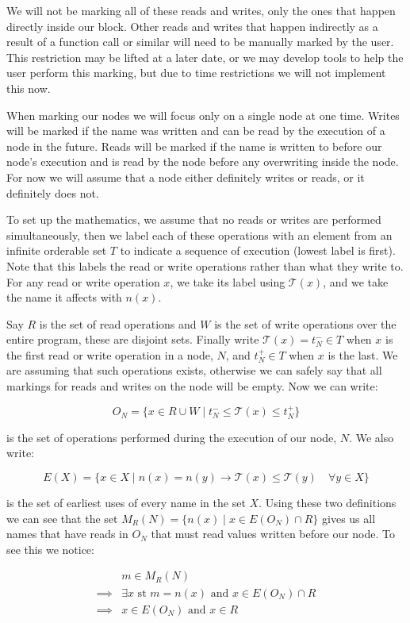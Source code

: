 \documentclass[twoside,a4paper]{report}
\begin{document}
We will not be marking all of these reads and writes, only the ones that happen directly inside our block. Other reads and writes that happen indirectly as a
result of a function call or similar will need to be manually marked by the user. This restriction may be lifted at a later date, or we may develop tools to help
the user perform this marking, but due to time restrictions we will not implement this now.

When marking our nodes we will focus only on a single node at one time. Writes will be marked if the name was written and can be read by the execution of a node in the
future. Reads will be marked if the name is written to before our node's execution and is read by the node before any
overwriting inside the node. For now we will assume that a node either definitely writes or reads, or it definitely does not.

To set up the mathematics, we assume that no reads or writes are performed simultaneously, then we label each of these operations with an element from an infinite
orderable set $T$ to
indicate a sequence of execution (lowest label is first). Note that this labels the read or write operations rather than what they write to. For any read or
write operation $x$, we take its label using $\mathcal{T}(x)$, and we take the name it affects with $n(x)$.

Say $R$ is the set of read operations and $W$ is the set of write operations over the entire program, these are disjoint sets. Finally write
$\mathcal{T}(x) = t^{-}_N \in T$ when $x$ is the first read or write operation in a node, $N$, and $t^{+}_N \in T$ when $x$ is the last. We are
assuming that such operations exists, otherwise we can safely say that all markings for reads and writes on the node will be empty. Now we can write:

$$O_N = \{x \in R \cup W \mid t^{-}_N \le \mathcal{T}(x) \le t^+_N \}$$

is the set of operations performed during the execution of our node, $N$. We also write:

$$E(X) = \{x \in X \mid n(x) = n(y) \rightarrow \mathcal{T}(x) \le \mathcal{T}(y) \quad \forall y \in X \}$$

is the set of earliest uses of every name in the set $X$. Using these two definitions we can see that the set $M_R(N) = \{n(x) \mid x \in E(O_N) \cap R \}$ gives us
all names that have reads in $O_N$ that must read values written before our node. To see this we notice:

\begin{align*}
         & m \in M_R(N) \\
\implies & \exists x \text{ st } m = n(x) \text{ and } x \in E(O_N) \cap R \\
\implies & x \in  E(O_N) \text{ and } x \in R \\
\end{align*}
\end{document}
